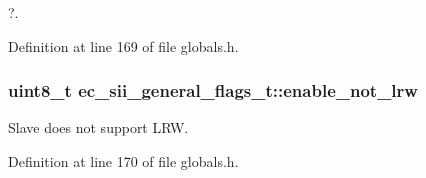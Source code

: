 ?. 



\-Definition at line 169 of file globals.\-h.

\subsubsection[{enable\-\_\-not\-\_\-lrw}]{\setlength{\rightskip}{0pt plus 5cm}uint8\-\_\-t {\bf ec\-\_\-sii\-\_\-general\-\_\-flags\-\_\-t\-::enable\-\_\-not\-\_\-lrw}}\label{structec__sii__general__flags__t_a0fbce42ba665c440531671f788ca46a0}


\-Slave does not support \-L\-R\-W. 



\-Definition at line 170 of file globals.\-h.

